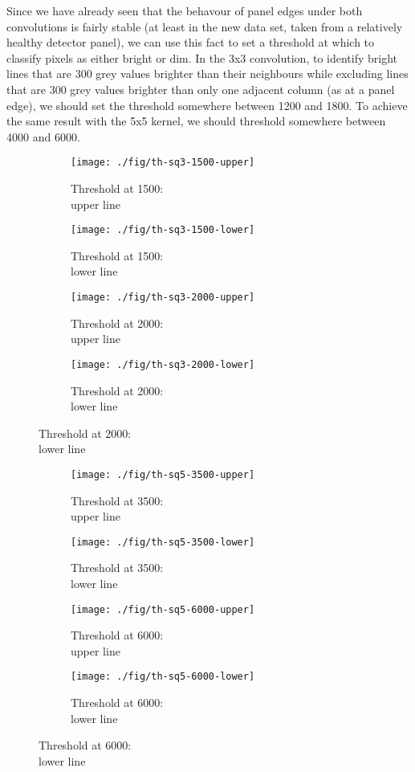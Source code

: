 \documentclass[10pt,fleqn]{article}
\begin{document}
Since we have already seen that the behavour of panel edges under both convolutions is fairly stable (at least in the new data set, taken from a relatively healthy detector panel), we can use this fact to set a threshold at which to classify pixels as either bright or dim. In the 3x3 convolution, to identify bright lines that are 300 grey values brighter than their neighbours while excluding lines that are 300 grey values brighter than only one adjacent column (as at a panel edge), we should set the threshold somewhere between 1200 and 1800. To achieve the same result with the 5x5 kernel, we should threshold somewhere between 4000 and 6000.

\begin{figure}[!ht]
\caption{High and low thresholds applied after convolution with 3x3 kernel}
\centering
%
\begin{subfigure}[t]{0.24\textwidth}
\caption{Threshold at 1500: \\upper line}
\texttt{[image: ./fig/th-sq3-1500-upper]}
\end{subfigure}
%
\begin{subfigure}[t]{0.24\textwidth}
\caption{Threshold at 1500: \\lower line}
\texttt{[image: ./fig/th-sq3-1500-lower]}
\end{subfigure}
%
\begin{subfigure}[t]{0.24\textwidth}
\caption{Threshold at 2000: \\upper line}
\texttt{[image: ./fig/th-sq3-2000-upper]}
\end{subfigure}
%
\begin{subfigure}[t]{0.24\textwidth}
\caption{Threshold at 2000: \\lower line}
\texttt{[image: ./fig/th-sq3-2000-lower]}
\end{subfigure}
%
\end{figure}


\begin{figure}[!ht]
\caption{High and low thresholds applied after convolution with 5x5 kernel}
\centering
%
\begin{subfigure}[t]{0.24\textwidth}
\caption{Threshold at 3500: \\upper line}
\texttt{[image: ./fig/th-sq5-3500-upper]}
\end{subfigure}
%
\begin{subfigure}[t]{0.24\textwidth}
\caption{Threshold at 3500: \\lower line}
\texttt{[image: ./fig/th-sq5-3500-lower]}
\end{subfigure}
%
\begin{subfigure}[t]{0.24\textwidth}
\caption{Threshold at 6000: \\upper line}
\texttt{[image: ./fig/th-sq5-6000-upper]}
\end{subfigure}
%
\begin{subfigure}[t]{0.24\textwidth}
\caption{Threshold at 6000: \\lower line}
\texttt{[image: ./fig/th-sq5-6000-lower]}
\end{subfigure}
%
\end{figure}
\end{document}
